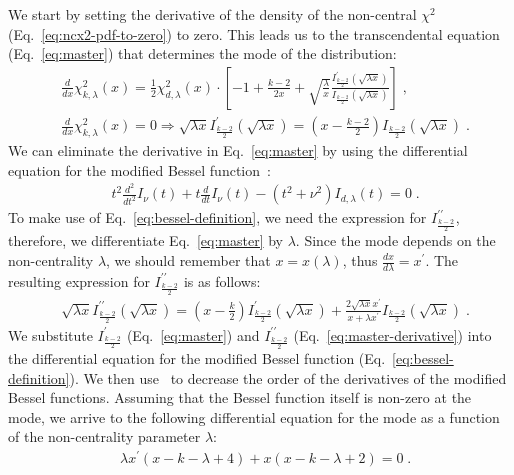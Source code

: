 \documentclass[final,5p,twocolumn,preprint,nopreprintline,times,authoryear]{elsarticle}
\begin{document}
We start by setting the derivative of the density of the non-central $\chi^2$ (Eq.~\ref{eq:ncx2-pdf-to-zero}) to zero. This leads us to the transcendental equation (Eq.~\ref{eq:master}) that determines the mode of the distribution:
%
\begin{align}
    &\frac{d}{dx} \chi^2_{k, \lambda}(x) = \frac{1}{2} \chi^2_{d, \lambda}(x) \cdot \left[ -1 + \frac{k-2}{2 x} + \sqrt{\frac{\lambda}{x}}\frac{I^{\prime}_{\frac{k-2}{2}}(\sqrt{\lambda x})}{I_{\frac{k-2}{2}}(\sqrt{\lambda x})} \right]\label{eq:ncx2-pdf-to-zero}\;, \\
    &\frac{d}{dx} \chi^2_{k, \lambda}(x) = 0 \Rightarrow \sqrt{\lambda x} I^{\prime}_{\frac{k-2}{2}}(\sqrt{\lambda x}) = (x - \frac{k-2}{2}) I_{\frac{k-2}{2}}(\sqrt{\lambda x})\label{eq:master}\;.
\end{align}
%
We can eliminate the derivative in Eq.~\ref{eq:master} by using the differential equation for the modified Bessel function~\cite[Eq.~10.25.1]{NIST:DLMF}:
%
\begin{align}
    &t^2 \frac{d^2}{dt^2} I_{\nu}(t) + t \frac{d}{dt} I_{\nu}(t) - (t^2 + \nu^2) I_{d, \lambda}(t) = 0 \label{eq:bessel-definition}\;.
\end{align}
%
To make use of Eq.~\ref{eq:bessel-definition}, we need the expression for $I^{\prime \prime}_{\frac{k-2}{2}}$, therefore, we differentiate Eq.~\ref{eq:master} by $\lambda$. Since the mode depends on the non-centrality $\lambda$, we should remember that $x = x(\lambda)$, thus $\frac{dx}{d\lambda} = x^{\prime}$. The resulting expression for $I^{\prime \prime}_{\frac{k-2}{2}}$ is as follows:
%
\begin{align}
    &\sqrt{\lambda x} I^{\prime \prime}_{\frac{k-2}{2}} (\sqrt{\lambda x}) =
    (x - \frac{k}{2}) I^{\prime}_{\frac{k-2}{2}}(\sqrt{\lambda x}) +  \frac{2 \sqrt{\lambda x} x^{\prime}}{x + \lambda x^\prime} I_{\frac{k-2}{2}}(\sqrt{\lambda x})\label{eq:master-derivative}\;.
\end{align}
%
We substitute $I^{\prime}_{\frac{k-2}{2}}$ (Eq.~\ref{eq:master}) and $I^{\prime \prime}_{\frac{k-2}{2}}$ (Eq.~\ref{eq:master-derivative}) into the differential equation for the modified Bessel function (Eq.~\ref{eq:bessel-definition}). We then use~\cite[Eq.~10.29.4]{NIST:DLMF} to decrease the order of the derivatives of the modified Bessel functions. Assuming that the Bessel function itself is non-zero at the mode, we arrive to the following differential equation for the mode as a function of the non-centrality parameter $\lambda$:
%
\begin{align}
    &\lambda x^{\prime} (x - k - \lambda + 4) + x (x - k - \lambda + 2) = 0\;.\label{eq:master-ode}
\end{align}
%
\end{document}
